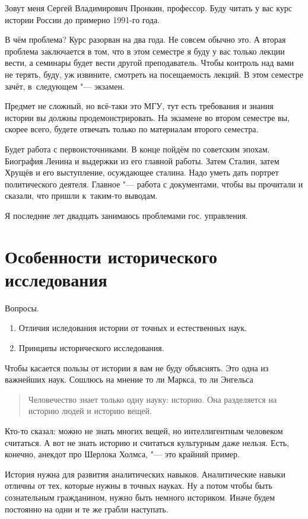 Зовут меня Сергей Владимирович Пронкин, профессор. Буду читать у вас курс истории России до примерно 1991-го года.

В чём проблема? Курс разорван на два года. Не совсем обычно это. А вторая проблема заключается в том, что в этом семестре я буду у вас только лекции вести, а семинары будет вести другой преподаватель. Чтобы контроль над вами не терять, буду, уж извините, смотреть на посещаемость лекций. В этом семестре зачёт, в~следующем "--- экзамен.

Предмет не сложный, но всё-таки это МГУ, тут есть требования и знания истории вы должны продемонстрировать. На экзамене во втором семестре вы, скорее всего, будете отвечать только по материалам второго семестра.

Будет работа с первоисточниками. В конце пойдём по советским эпохам. Биография Ленина и выдержки из его главной работы. Затем Сталин, затем Хрущёв и его выступление, осуждающее сталина. Надо уметь дать портрет политического деятеля. Главное "--- работа с документами, чтобы вы прочитали и сказали, что пришли к~таким-то выводам.

Я последние лет двадцать занимаюсь проблемами гос. управления.

\section{Особенности исторического исследования}
Вопросы.
\begin{enumerate}
\item Отличия иследования истории от точных и естественных наук.
\item Принципы исторического исследования.
\end{enumerate}
Чтобы касается пользы от истории я вам не буду объяснять. Это одна из важнейших наук. Сошлюсь на мнение то ли Маркса, то ли Энгельса
\begin{quote}
Человечество знает только одну науку: историю. Она разделяется на историю людей и историю вещей.
\end{quote}

Кто-то сказал: можно не знать многих вещей, но интеллигентным человеком считаться. А вот не знать историю и считаться культурным даже нельзя. Есть, конечно, анекдот про Шерлока Холмса, "--- это крайний пример.

История нужна для развития аналитических навыков. Аналитические навыки отличны от тех, которые нужны в точных науках. Ну а потом чтобы быть сознательным гражданином, нужно быть немного историком. Иначе будем постоянно на одни и те же грабли наступать.


